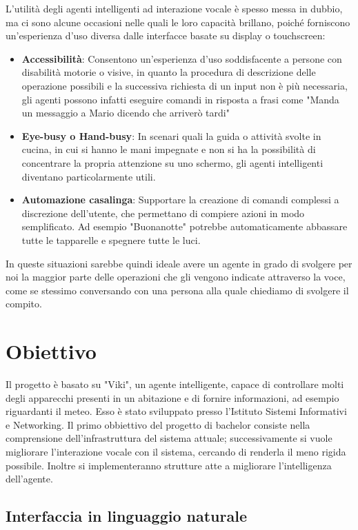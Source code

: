 \documentclass[twoside]{supsistudent}
\begin{document}
L'utilità degli agenti intelligenti ad interazione vocale è spesso messa in dubbio, ma ci sono alcune occasioni nelle quali le loro capacità brillano, poiché forniscono un'esperienza d'uso diversa dalle interfacce basate su display o touchscreen:
\begin{itemize}
	\item \textbf{Accessibilità}: Consentono un'esperienza d'uso soddisfacente a persone con disabilità motorie o visive, in quanto la procedura di descrizione delle operazione possibili e la successiva richiesta di un input non è più necessaria, gli agenti possono infatti eseguire comandi in risposta a frasi come "Manda un messaggio a Mario dicendo che arriverò tardi"
	\item \textbf{Eye-busy o Hand-busy}: In scenari quali la guida o attività svolte in cucina, in cui si hanno le mani impegnate e non si ha la possibilità di concentrare la propria attenzione su uno schermo, gli agenti intelligenti diventano particolarmente utili.
	\item \textbf{Automazione casalinga}: Supportare la creazione di comandi complessi a discrezione dell'utente, che permettano di compiere azioni in modo semplificato. Ad esempio "Buonanotte" potrebbe automaticamente abbassare tutte le tapparelle e spegnere tutte le luci.
\end{itemize}
In queste situazioni sarebbe quindi ideale avere un agente in grado di svolgere per noi la maggior parte delle operazioni che gli vengono indicate attraverso la voce, come se stessimo conversando con una persona alla quale chiediamo di svolgere il compito.

\chapter{Obiettivo}

Il progetto è basato su "Viki", un agente intelligente, capace di controllare molti degli apparecchi presenti in un abitazione e di fornire informazioni, ad esempio riguardanti il meteo.\cite{agenteinteligente}
Esso è stato sviluppato presso l'Istituto Sistemi Informativi e Networking. \cite{ISIN}
Il primo obbiettivo del progetto di bachelor consiste nella comprensione dell'infrastruttura del sistema attuale; successivamente si  vuole migliorare l'interazione vocale con il sistema, cercando di renderla il meno rigida possibile. Inoltre si implementeranno strutture atte a migliorare l'intelligenza dell'agente.

\section{Interfaccia in linguaggio naturale}
\end{document}
